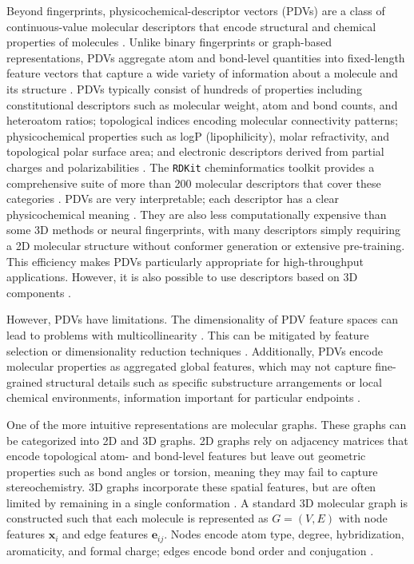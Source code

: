 Beyond fingerprints, physicochemical-descriptor vectors (PDVs) are a class of continuous-value molecular descriptors that encode structural and chemical properties of molecules \citep{Todeschini2009}. Unlike binary fingerprints or graph-based representations, PDVs aggregate atom and bond-level quantities into fixed-length feature vectors that capture a wide variety of information about a molecule and its structure \citep{Mauri2006}. PDVs typically consist of hundreds of properties including constitutional descriptors such as molecular weight, atom and bond counts, and heteroatom ratios; topological indices encoding molecular connectivity patterns; physicochemical properties such as logP (lipophilicity), molar refractivity, and topological polar surface area; and electronic descriptors derived from partial charges and polarizabilities \citep{Todeschini2009, Cherkasov2014}. The \texttt{RDKit} cheminformatics toolkit provides a comprehensive suite of more than 200 molecular descriptors that cover these categories \citep{rdkit}. PDVs are very interpretable; each descriptor has a clear physicochemical meaning \citep{Cherkasov2014}. They are also less computationally expensive than some 3D methods or neural fingerprints, with many descriptors simply requiring a 2D molecular structure without conformer generation or extensive pre-training. This efficiency makes PDVs particularly appropriate for high-throughput applications. However, it is also possible to use descriptors based on 3D components \citep{Mauri2006}.

However, PDVs have limitations. The dimensionality of PDV feature spaces can lead to problems with multicollinearity \citep{Todeschini2009}. This can be mitigated by feature selection or dimensionality reduction techniques \citep{Cherkasov2014}. Additionally, PDVs encode molecular properties as aggregated global features, which may not capture fine-grained structural details such as specific substructure arrangements or local chemical environments, information important for particular endpoints \citep{Mauri2006}.

One of the more intuitive representations are molecular graphs. These graphs can be categorized into 2D and 3D graphs. 2D graphs rely on adjacency matrices that encode topological atom- and bond-level features but leave out geometric properties such as bond angles or torsion, meaning they may fail to capture stereochemistry. 3D graphs incorporate these spatial features, but are often limited by remaining in a single conformation \citep{Zhichun2023}. A standard 3D molecular graph is constructed such that each molecule is represented as $G = (V,E)$ with node features $\mathbf{x}_i$ and edge features $\mathbf{e}_{ij}$. Nodes encode atom type, degree, hybridization, aromaticity, and formal charge; edges encode bond order and conjugation \citep{Zhichun2023}. 

